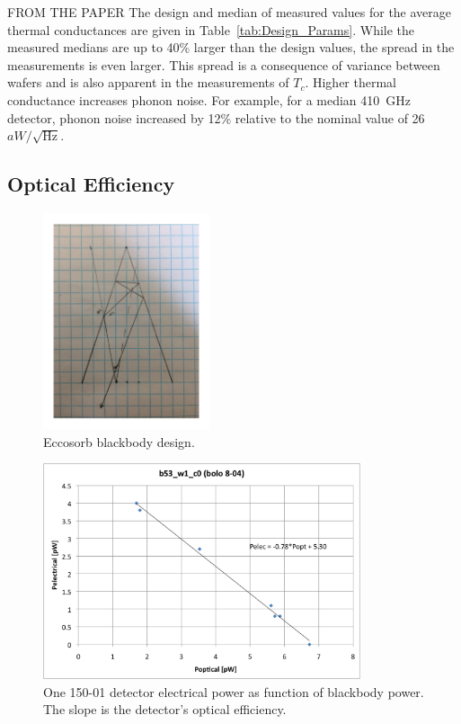FROM THE PAPER
The design and median of measured values for the average thermal conductances are given in Table~\ref{tab:Design_Params}. While the 
measured medians are up to 40\% larger than the design values, the spread in the measurements is even larger. This spread is 
a consequence of variance between wafers and is also apparent in the measurements of $T_{c}$. 
Higher thermal conductance increases phonon noise. For example, for a median 410~GHz detector, phonon noise increased by 
12\% relative to the nominal value of 26~$aW/\sqrt{\mathrm{Hz}}$. 


\subsection{Optical Efficiency}
\label{sec:optical_efficiency}

\begin{figure}[ht!]
\begin{center}
\includegraphics[height=2.5in]{figures/blackbody_design2}
\caption{Eccosorb blackbody design. 
\label{fig:blackbody_design} }
\end{center}
\end{figure}

\begin{figure}[ht!]
\begin{center}
\includegraphics[height=2.5in]{figures/Nb01_PelecvsPopt_b53_w1_c0}
\caption{One 150-01 detector electrical power as function of blackbody power. The slope is the detector's optical efficiency. 
\label{fig:pelec_vs_popt} }
\end{center}
\end{figure}


